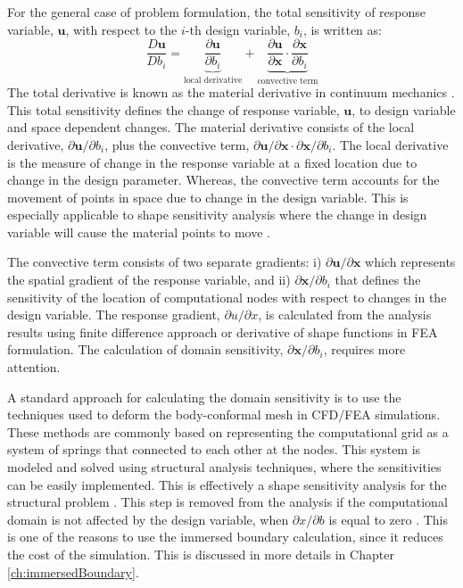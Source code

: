 For the general case of problem formulation, the total sensitivity of response variable, $\mathbf{u}$, with respect to the $i$-th design variable, $b_i$, is written as:
%
\begin{equation}\label{eq:C2_totalSensitivityDef}
    \frac{D \mathbf{u}}{D b_i} = 
    \underbrace{\frac{\partial \mathbf{u}}{\partial b_i}}_\text{local derivative} + 
    \underbrace{\frac{\partial \mathbf{u}}{\partial \mathbf{x}} \cdot
    \frac{\partial \mathbf{x}}{\partial b_i}}_\text{convective term}
\end{equation}
%
The total derivative is known as the material derivative in continuum mechanics \cite{mase2009continuum}. This total sensitivity defines the change of response variable, $\mathbf{u}$, to design variable and space dependent changes. The material derivative consists of the local derivative, $\partial \mathbf{u}/\partial b_i$, plus the convective term, $\partial \mathbf{u}/\partial \mathbf{x} \cdot \partial \mathbf{x}/\partial b_i$. The local derivative is the measure of change in the response variable at a fixed location due to change in the design parameter. Whereas, the convective term accounts for the movement of points in space due to change in the design variable. This is especially applicable to shape sensitivity analysis where the change in design variable will cause the material points to move \cite{cross2014local}.

The convective term consists of two separate gradients: i) $\partial \mathbf{u} / \partial \mathbf{x}$ which represents the spatial gradient of the response variable, and ii) $\partial \mathbf{x} / \partial b_i$ that defines the sensitivity of the location of computational nodes with respect to changes in the design variable. The response gradient, $\partial u/\partial x$, is calculated from the analysis results using finite difference approach or derivative of shape functions in FEA formulation. The calculation of domain sensitivity, $\partial \mathbf{x} / \partial b_i$, requires more attention.

A standard approach for calculating the domain sensitivity is to use the techniques used to deform the body-conformal mesh in CFD/FEA simulations. These methods are commonly based on representing the computational grid as a system of springs that connected to each other at the nodes. This system is modeled and solved using structural analysis techniques, where the sensitivities can be easily implemented. This is effectively a shape sensitivity analysis for the structural problem \cite{haftka1986structural}. This step is removed from the analysis if the computational domain is not affected by the design variable, when $\partial x/\partial b$ is equal to zero \cite{gobal2014continuum}. This is one of the reasons to use the immersed boundary calculation, since it reduces the cost of the simulation. This is discussed in more details in Chapter \ref{ch:immersedBoundary}.


